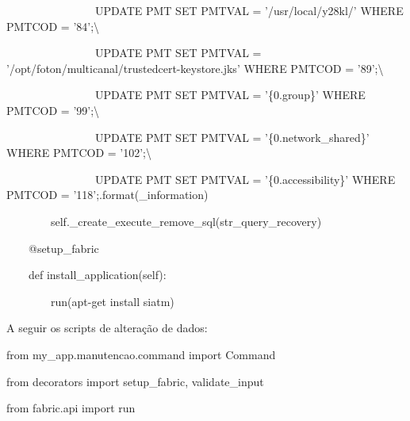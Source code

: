 {\ttfamily\color[rgb]{0.10980392,0.10980392,0.10980392}
    \ \ \ \ \ \ \ \ \ \ \ \ \ \ \ \ UPDATE PMT SET PMTVAL = '/usr/local/y28kl/' WHERE PMTCOD = '84';{\textbackslash}}

{\ttfamily\color[rgb]{0.10980392,0.10980392,0.10980392}
    \ \ \ \ \ \ \ \ \ \ \ \ \ \ \ \ UPDATE PMT SET PMTVAL = '/opt/foton/multicanal/trustedcert-keystore.jks' WHERE PMTCOD =
        '89';{\textbackslash}}

{\ttfamily\color[rgb]{0.10980392,0.10980392,0.10980392}
    \ \ \ \ \ \ \ \ \ \ \ \ \ \ \ \ UPDATE PMT SET PMTVAL = '\{0.group\}' WHERE PMTCOD = '99';{\textbackslash}}

{\ttfamily\color[rgb]{0.10980392,0.10980392,0.10980392}
    \ \ \ \ \ \ \ \ \ \ \ \ \ \ \ \ UPDATE PMT SET PMTVAL = '\{0.network\_shared\}' WHERE PMTCOD = '102';{\textbackslash}}

{\ttfamily\color[rgb]{0.10980392,0.10980392,0.10980392}
    \ \ \ \ \ \ \ \ \ \ \ \ \ \ \ \ UPDATE PMT SET PMTVAL = '\{0.accessibility\}' WHERE PMTCOD =
        '118';{\textquotedbl}{\textquotedbl}{\textquotedbl}.format(\_information)}


        \bigskip

{\ttfamily\color[rgb]{0.10980392,0.10980392,0.10980392}
    \ \ \ \ \ \ \ \ self.\_create\_execute\_remove\_sql(str\_query\_recovery)}


    \bigskip

{\ttfamily\color[rgb]{0.10980392,0.10980392,0.10980392}
    \ \ \ \ @setup\_fabric}

{\ttfamily\color[rgb]{0.10980392,0.10980392,0.10980392}
    \ \ \ \ def install\_application(self):}

{\ttfamily\color[rgb]{0.10980392,0.10980392,0.10980392}
    \ \ \ \ \ \ \ \ run({\textquotedbl}apt-get install siatm{\textquotedbl})}


    \bigskip

{\color{black}
    A seguir os scripts de altera\c{c}\~ao de dados:}

{\ttfamily\color[rgb]{0.10980392,0.10980392,0.10980392}
    from my\_app.manutencao.command import Command}

{\ttfamily\color[rgb]{0.10980392,0.10980392,0.10980392}
    from decorators import setup\_fabric, validate\_input}

{\ttfamily\color[rgb]{0.10980392,0.10980392,0.10980392}
    from fabric.api import run}


    \bigskip


    \bigskip

